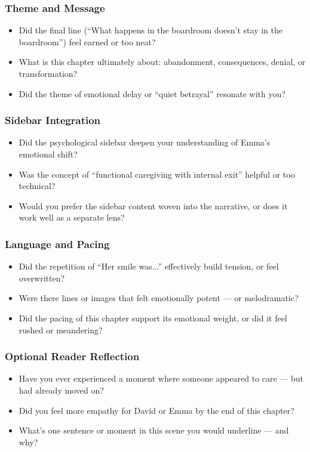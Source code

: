 \subsubsection{Theme and Message}

\begin{itemize}
  \item Did the final line (“What happens in the boardroom doesn’t stay in the boardroom”) feel earned or too neat?
  \item What is this chapter ultimately about: abandonment, consequences, denial, or transformation?
  \item Did the theme of emotional delay or “quiet betrayal” resonate with you?
\end{itemize}

\subsubsection{Sidebar Integration}

\begin{itemize}
  \item Did the psychological sidebar deepen your understanding of Emma’s emotional shift?
  \item Was the concept of “functional caregiving with internal exit” helpful or too technical?
  \item Would you prefer the sidebar content woven into the narrative, or does it work well as a separate lens?
\end{itemize}

\subsubsection{Language and Pacing}

\begin{itemize}
  \item Did the repetition of “Her smile was...” effectively build tension, or feel overwritten?
  \item Were there lines or images that felt emotionally potent — or melodramatic?
  \item Did the pacing of this chapter support its emotional weight, or did it feel rushed or meandering?
\end{itemize}

\subsubsection{Optional Reader Reflection}

\begin{itemize}
  \item Have you ever experienced a moment where someone appeared to care — but had already moved on?
  \item Did you feel more empathy for David or Emma by the end of this chapter?
  \item What’s one sentence or moment in this scene you would underline — and why?
\end{itemize}

